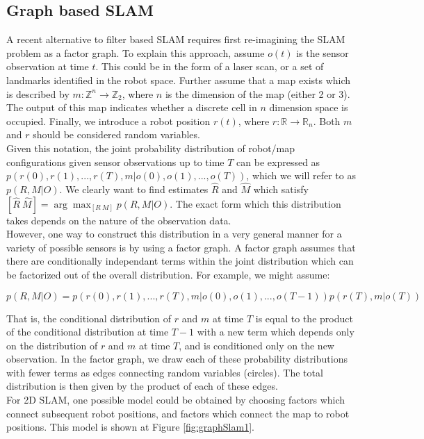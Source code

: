 \documentclass[capstone_report.tex]{subfiles}
\begin{document}
\subsection{Graph based SLAM}
A recent alternative to filter based SLAM requires first re-imagining the SLAM problem as a factor graph. To explain this approach, assume $o(t)$ is the sensor observation at time $t$. This could be in the form of a laser scan, or a set of landmarks identified in the robot space. Further assume that a map exists which is described by $m:\mathbb Z^n\to\mathbb Z_2$, where $n$ is the dimension of the map (either 2 or 3). The output of this map indicates whether a discrete cell in $n$ dimension space is occupied. Finally, we introduce a robot position $r(t)$, where $r:\mathbb R\to\mathbb R_n$. Both $m$ and $r$ should be considered random variables.\\

Given this notation, the joint probability distribution of robot/map configurations given sensor observations up to time $T$ can be expressed as $p(r(0), r(1), ... , r(T), m | o(0), o(1), ... , o(T))$, which we will refer to as $p(R,M|O)$. We clearly want to find estimates $\hat{R}$ and $\hat{M}$ which satisfy $[\hat{R} \ \hat{M}] = \arg \max_{[R \  M]} p(R,M|O)$. The exact form which this distribution takes depends on the nature of the observation data.\\

However, one way to construct this distribution in a very general manner for a variety of possible sensors is by using a factor graph. A factor graph assumes that there are conditionally independant terms within the joint distribution which can be factorized out of the overall distribution. For example, we might assume:

\[
  p(R,M|O)= p(r(0), r(1), ... , r(T), m | o(0), o(1), ... , o(T-1))p(r(T), m | o(T))
\]

That is, the conditional distribution of $r$ and $m$ at time $T$ is equal to the product of the conditional distribution at time $T-1$ with a new term which depends only on the distribution of $r$ and $m$ at time $T$, and is conditioned only on the new observation. In the factor graph, we draw each of these probability distributions with fewer terms as edges connecting random variables (circles). The total distribution is then given by the product of each of these edges.\\ 

For 2D SLAM, one possible model could be obtained by choosing factors which connect subsequent robot positions, and factors which connect the map to robot positions. This model is shown at Figure \ref{fig:graphSlam1}.
\end{document}

